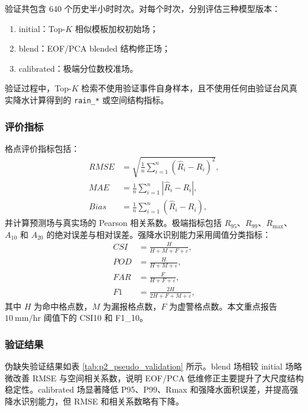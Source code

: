 \documentclass[UTF8,a4paper,zihao=5,fontset=fandol]{ctexart}
\numberwithin{equation}{section}
\numberwithin{figure}{section}
\numberwithin{table}{section}
\begin{document}
验证共包含 $640$ 个历史半小时时次。对每个时次，分别评估三种模型版本：
\begin{enumerate}
    \item initial：Top-$K$ 相似模板加权初始场；
    \item blend：EOF/PCA blended 结构修正场；
    \item calibrated：极端分位数校准场。
\end{enumerate}
验证过程中，Top-$K$ 检索不使用验证事件自身样本，且不使用任何由验证台风真实降水计算得到的 \texttt{rain\_*} 或空间结构指标。

\subsubsection{评价指标}

格点评价指标包括：
\begin{align}
RMSE &= \sqrt{\frac{1}{n}\sum_{i=1}^{n}(\hat R_i-R_i)^2},\\
MAE &= \frac{1}{n}\sum_{i=1}^{n}|\hat R_i-R_i|,\\
Bias &= \frac{1}{n}\sum_{i=1}^{n}(\hat R_i-R_i),
\end{align}
并计算预测场与真实场的 Pearson 相关系数。极端指标包括 $R_{95}$、$R_{99}$、$R_{\max}$、$A_{10}$ 和 $A_{20}$ 的绝对误差与相对误差。强降水识别能力采用阈值分类指标：
\begin{align}
CSI &= \frac{H}{H+M+F+\varepsilon},\\
POD &= \frac{H}{H+M+\varepsilon},\\
FAR &= \frac{F}{H+F+\varepsilon},\\
F1 &= \frac{2H}{2H+F+M+\varepsilon},
\end{align}
其中 $H$ 为命中格点数，$M$ 为漏报格点数，$F$ 为虚警格点数。本文重点报告 $10\ \mathrm{mm/hr}$ 阈值下的 CSI10 和 F1\_10。

\subsubsection{验证结果}

伪缺失验证结果如表 \ref{tab:p2_pseudo_validation} 所示。blend 场相较 initial 场略微改善 RMSE 与空间相关系数，说明 EOF/PCA 低维修正主要提升了大尺度结构稳定性。calibrated 场显著降低 P95、P99、Rmax 和强降水面积误差，并提高强降水识别能力，但 RMSE 和相关系数略有下降。
\end{document}
